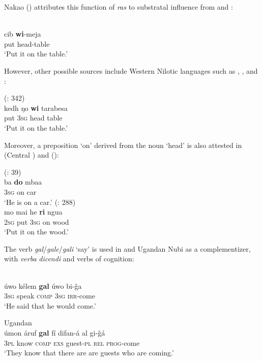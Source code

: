 \documentclass[output=paper]{langsci/langscibook}
\begin{document}
Nakao (\citeyear[141]{Nakao2012}) attributes this function of \textit{ras} to substratal influence from  and :

\ea
{ \citep[141]{Nakao2012}}\\
\gll            cib \textbf{wi}-meja\\
                put head-table\\
\glt     `Put it on the table.'
\z
 
However, other possible sources include Western Nilotic languages such as , ,  and :

\ea
{  (\citealt{PozzatiPanza1993}: 342)}\\
\gll     kedh ŋo \textbf{wi} tarabesa\\
         put 3\textsc{sg} head table\\
\glt     `Put it on the table.'
\z

Moreover, a {preposition} ‘on’ derived from the noun ‘head’ is also attested in  (Central ) and  ():

\ea
{ (\citealt{Moietal2014}: 39)}\\
\gll            ba \textbf{do} mbaa\\
                3\textsc{sg} on car\\
\glt     `He is on a car.'
\ex
{ (\citealt{DeAngelis2002}: 288)}\\
\gll            mo mai he \textbf{ri} ngua\\
                2\textsc{sg} put 3\textsc{sg} on wood\\
\glt     `Put it on the wood.'
\z

The verb \textit{gal}/\textit{gale}/\textit{gali} ‘say’ is used in   and Ugandan Nubi as a {complementizer}, with \textit{verba} \textit{dicendi} and verbs of cognition:

\ea
\ea {}  \citep[469]{Miller2001}\\
\gll     úwo kélem \textbf{gal} úwo bi-ǧa\\
         3\textsc{sg} speak \textsc{comp} 3\textsc{sg} \textsc{irr}-come\\
\glt       `He said that he would come.'

\ex
Ugandan  \citep[204]{Wellens2003}\\
\gll     úmon áruf \textbf{gal} fí difan-á al gi-ǧá\\
         3\textsc{pl} know \textsc{comp} \textsc{exs} guest-\textsc{pl} \textsc{rel} \textsc{prog}-come\\
\glt    `They know that there are are guests who are coming.' 
\z
\z
\end{document}
